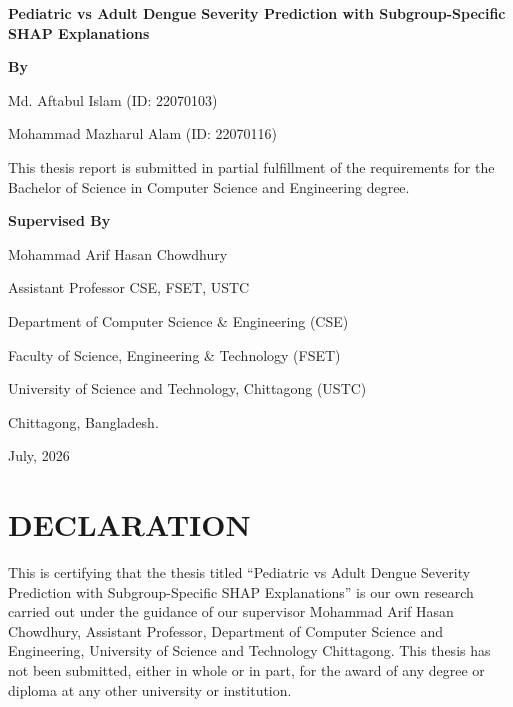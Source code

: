 \documentclass[12pt, a4paper]{report}
\begin{document}
\begin{titlepage}
    \centering
    \vspace*{2cm}
    
    {\Huge \textbf{Pediatric vs Adult Dengue Severity Prediction with Subgroup-Specific SHAP Explanations}\par}
    \vspace{2cm}
    
    {\Large \textbf{By}\par}
    \vspace{0.5cm}
    {\large Md. Aftabul Islam (ID: 22070103)\par}
    {\large Mohammad Mazharul Alam (ID: 22070116)\par}
    
    \vspace{2cm}
    {\large This thesis report is submitted in partial fulfillment of the requirements for the Bachelor of Science in Computer Science and Engineering degree.\par}
    
    \vspace{2cm}
    {\large \textbf{Supervised By}\par}
    {\large Mohammad Arif Hasan Chowdhury\par}
    {\large Assistant Professor CSE, FSET, USTC\par}
    
    \vfill
    
    {\large Department of Computer Science \& Engineering (CSE)\par}
    {\large Faculty of Science, Engineering \& Technology (FSET)\par}
    {\large University of Science and Technology, Chittagong (USTC)\par}
    {\large Chittagong, Bangladesh.\par}
    {\large July, 2026\par}
\end{titlepage}


\chapter*{DECLARATION}
This is certifying that the thesis titled ``Pediatric vs Adult Dengue Severity Prediction with Subgroup-Specific SHAP Explanations'' is our own research carried out under the guidance of our supervisor Mohammad Arif Hasan Chowdhury, Assistant Professor, Department of Computer Science and Engineering, University of Science and Technology Chittagong. This thesis has not been submitted, either in whole or in part, for the award of any degree or diploma at any other university or institution.
\end{document}
